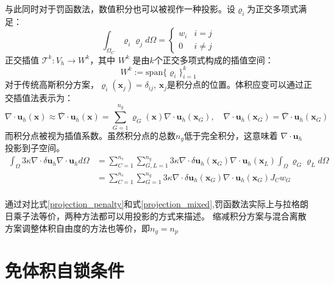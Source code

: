 与此同时对于罚函数法，数值积分也可以被视作一种投影。设$\varrho_i$为正交多项式满足：
\begin{equation}
    \int_{\Omega_C} \varrho_i \varrho_j d\Omega = 
    \begin{cases}
        w_i  & i = j \\
        0 & i \ne j
    \end{cases}
\end{equation}
正交插值 $\mathcal T^{k}: V_h \rightarrow W^{k}$，其中 $W^{k}$ 是由$k$个正交多项式构成的插值空间：
\begin{equation}
    W^{k}:= \mathrm{span}\{\varrho_i \}_{i=1}^{k}
\end{equation}
对于传统高斯积分方案，$\varrho_i(\boldsymbol x_j) = \delta_{ij}$, $\boldsymbol x_j$是积分点的位置。体积应变可以通过正交插值法表示为：
\begin{equation}
    \nabla \cdot \boldsymbol u_h(\boldsymbol x) \approx \bar \nabla \cdot \boldsymbol u_h(\boldsymbol x) = \sum_{G=1}^{n_g} \varrho_G(\boldsymbol x) \nabla \cdot \boldsymbol u_h(\boldsymbol x_G), \quad \nabla \cdot \boldsymbol u_h(\boldsymbol x_G) = \bar \nabla \cdot \boldsymbol u_h(\boldsymbol x_G)
\end{equation}
而积分点被视为插值系数。虽然积分点的总数$n_g$低于完全积分，这意味着 $\nabla \cdot \boldsymbol u_h$ 投影到子空间。
\begin{equation}\label{projection_penalty}
    \begin{split}
        \int_\Omega 3\kappa \nabla \cdot \delta \boldsymbol u_h \nabla \cdot \boldsymbol u_h d\Omega
        &= \sum_{C=1}^{n_e} \sum_{G,L=1}^{n_g} 3\kappa \nabla \cdot \delta \boldsymbol u_h(\boldsymbol x_G) \nabla \cdot \boldsymbol u_h(\boldsymbol x_L) \int_\Omega \varrho_G \varrho_L d\Omega  \\
        &= \sum_{C=1}^{n_e} \sum_{G=1}^{n_g} 3\kappa \nabla \cdot \delta \boldsymbol u_h(\boldsymbol x_G) \nabla \cdot \boldsymbol u_h(\boldsymbol x_G) J_C w_G \\
    \end{split}
\end{equation}

通过对比式\eqref{projection_penalty}和式\eqref{projection_mixed},罚函数法实际上与拉格朗日乘子法等价，两种方法都可以用投影的方式来描述。
缩减积分方案与混合离散方案调整体积自由度的方法也等价，即$n_g=n_p$

\section{免体积自锁条件}

